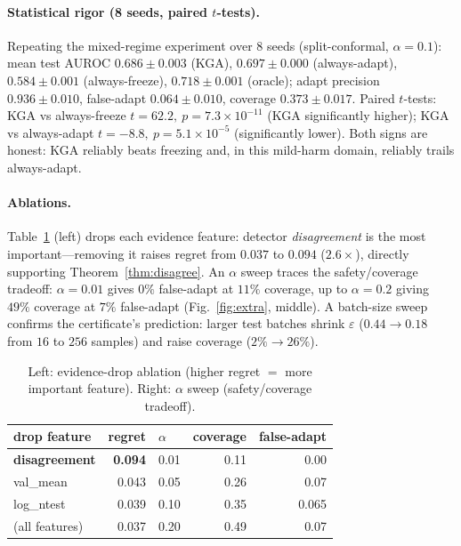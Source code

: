 \documentclass[11pt]{article}
\theoremstyle{plain}
\theoremstyle{definition}
\begin{document}
\paragraph{Statistical rigor (8 seeds, paired $t$-tests).} Repeating the mixed-regime
experiment over 8 seeds (split-conformal, $\alpha{=}0.1$): mean test AUROC
$0.686\pm0.003$ (\textsc{KGA}), $0.697\pm0.000$ (always-adapt), $0.584\pm0.001$
(always-freeze), $0.718\pm0.001$ (oracle); adapt precision $0.936\pm0.010$, false-adapt
$0.064\pm0.010$, coverage $0.373\pm0.017$. Paired $t$-tests: \textsc{KGA} vs
always-freeze $t{=}62.2,\ p{=}7.3\times10^{-11}$ (\textsc{KGA} significantly higher);
\textsc{KGA} vs always-adapt $t{=}-8.8,\ p{=}5.1\times10^{-5}$ (significantly lower).
Both signs are honest: \textsc{KGA} reliably beats freezing and, in this mild-harm
domain, reliably trails always-adapt.

\paragraph{Ablations.} Table~\ref{tab:abl} (left) drops each evidence feature: detector
\emph{disagreement} is the most important---removing it raises regret from $0.037$ to
$0.094$ ($2.6\times$), directly supporting Theorem~\ref{thm:disagree}. An $\alpha$ sweep
traces the safety/coverage tradeoff: $\alpha{=}0.01$ gives $0\%$ false-adapt at $11\%$
coverage, up to $\alpha{=}0.2$ giving $49\%$ coverage at $7\%$ false-adapt
(Fig.~\ref{fig:extra}, middle). A batch-size sweep confirms the certificate's
prediction: larger test batches shrink $\varepsilon$ ($0.44\!\to\!0.18$ from $16$ to
$256$ samples) and raise coverage ($2\%\!\to\!26\%$).

\begin{table}[h]\centering\small
\begin{tabular}{lr@{\hskip 2em}lrr}
\toprule
drop feature & regret & $\alpha$ & coverage & false-adapt\\
\midrule
\textbf{disagreement} & \textbf{0.094} & 0.01 & 0.11 & 0.00\\
val\_mean & 0.043 & 0.05 & 0.26 & 0.07\\
log\_ntest & 0.039 & 0.10 & 0.35 & 0.065\\
(all features) & 0.037 & 0.20 & 0.49 & 0.07\\
\bottomrule
\end{tabular}
\caption{Left: evidence-drop ablation (higher regret $=$ more important feature).
Right: $\alpha$ sweep (safety/coverage tradeoff).}
\label{tab:abl}
\end{table}
\end{document}
